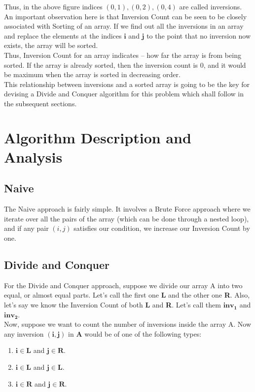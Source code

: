 \documentclass[conference]{IEEEtran}
\begin{document}
\noindent Thus, in the above figure indices $(0,1) , (0,2) , (0,4)$ are called inversions. \\
An important observation here is that Inversion Count can be seen to be closely associated with Sorting of an array. If we find out all the inversions in an array and replace the elements at the indices $\bm{i}$ and $\bm{j}$ to the point that no inversion now exists, the array will be sorted. \\
Thus, Inversion Count for an array indicates – how far the array is from being sorted. If the array is already sorted, then the inversion count is 0, and it would be maximum when the array is sorted in decreasing order. \\
This relationship between inversions and a sorted array is going to be the key for devising a Divide and Conquer algorithm for this problem which shall follow in the subsequent sections.


\section{\textbf{Algorithm Description and Analysis}}

\subsection{Naive}

\noindent The Naive approach is fairly simple. It involves a Brute Force approach where we iterate over all the pairs of the array (which can be done through a nested loop), and if any pair $(i,j)$ satisfies our condition, we increase our Inversion Count by one.

\subsection{Divide and Conquer}
\noindent For the Divide and Conquer approach, suppose we divide our array A into two equal, or almost equal parts. Let's call the first one \textbf{L} and the other one \textbf{R}. Also, let's say we know the Inversion Count of both \textbf{L} and \textbf{R}. Let's call them $\bm{inv_1}$ and $\bm{inv_2}$. \\
Now, suppose we want to count the number of inversions inside the array A. Now any inversion $\bm{(i,j)}$ in \textbf{A} would be of one of the following types: \\

\begin{enumerate}
  \item  $\bm{i \in L}$ and $\bm{j \in R}$.
  \item  $\bm{i \in L}$ and $\bm{j \in L}$.
  \item  $\bm{i \in R}$ and $\bm{j \in R}$.
\end {enumerate}
\end{document}
